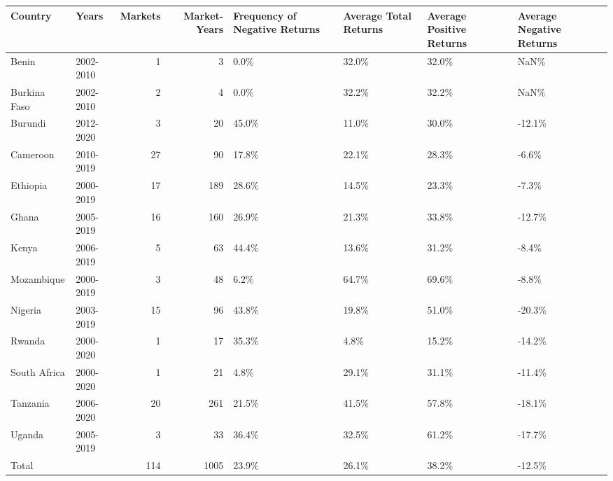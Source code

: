 \begin{table}[ht]
\centering
\begin{tabular}{llrrllll}
  \hline
Country & Years & Markets & Market-Years & Frequency of Negative Returns & Average Total Returns & Average Positive Returns & Average Negative Returns \\ 
  \hline
Benin & 2002-2010 &   1 &   3 & 0.0\% & 32.0\% & 32.0\% & NaN\% \\ 
  Burkina Faso & 2002-2010 &   2 &   4 & 0.0\% & 32.2\% & 32.2\% & NaN\% \\ 
  Burundi & 2012-2020 &   3 &  20 & 45.0\% & 11.0\% & 30.0\% & -12.1\% \\ 
  Cameroon & 2010-2019 &  27 &  90 & 17.8\% & 22.1\% & 28.3\% & -6.6\% \\ 
  Ethiopia & 2000-2019 &  17 & 189 & 28.6\% & 14.5\% & 23.3\% & -7.3\% \\ 
  Ghana & 2005-2019 &  16 & 160 & 26.9\% & 21.3\% & 33.8\% & -12.7\% \\ 
  Kenya & 2006-2019 &   5 &  63 & 44.4\% & 13.6\% & 31.2\% & -8.4\% \\ 
  Mozambique & 2000-2019 &   3 &  48 & 6.2\% & 64.7\% & 69.6\% & -8.8\% \\ 
  Nigeria & 2003-2019 &  15 &  96 & 43.8\% & 19.8\% & 51.0\% & -20.3\% \\ 
  Rwanda & 2000-2020 &   1 &  17 & 35.3\% & 4.8\% & 15.2\% & -14.2\% \\ 
  South Africa & 2000-2020 &   1 &  21 & 4.8\% & 29.1\% & 31.1\% & -11.4\% \\ 
  Tanzania & 2006-2020 &  20 & 261 & 21.5\% & 41.5\% & 57.8\% & -18.1\% \\ 
  Uganda & 2005-2019 &   3 &  33 & 36.4\% & 32.5\% & 61.2\% & -17.7\% \\ 
  Total &   & 114 & 1005 & 23.9\% & 26.1\% & 38.2\% & -12.5\% \\ 
   \hline
\end{tabular}
\end{table}
